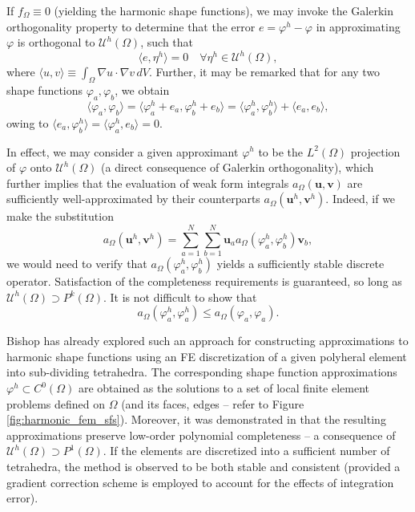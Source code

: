 	If $f_\Omega \equiv 0$ (yielding the harmonic shape functions), we may invoke the Galerkin orthogonality property to determine that the error $e = \varphi^h - \varphi$ in approximating $\varphi$ is orthogonal to $\mathcal{U}^h (\Omega)$, such that
	\begin{equation}
		\langle e, \eta^h \rangle = 0 \quad \forall \eta^h \in \mathcal{U}^h (\Omega),
	\end{equation}
	where $\langle u, v \rangle \equiv \int_\Omega \nabla u \cdot \nabla v \, dV$. Further, it may be remarked that for any two shape functions $\varphi_a, \varphi_b$, we obtain
	\begin{equation}
		\langle \varphi_a, \varphi_b \rangle = \langle \varphi^h_a + e_a, \varphi^h_b + e_b \rangle = \langle \varphi^h_a, \varphi^h_b \rangle + \langle e_a, e_b \rangle,
	\end{equation}
	owing to $\langle e_a, \varphi^h_b \rangle = \langle \varphi^h_a, e_b \rangle = 0$.

	In effect, we may consider a given approximant $\varphi^h$ to be the $L^2(\Omega)$ projection of $\varphi$ onto $\mathcal{U}^h (\Omega)$ (a direct consequence of Galerkin orthogonality), which further implies that the evaluation of weak form integrals $a_\Omega (\mathbf{u}, \mathbf{v})$ are sufficiently well-approximated by their counterparts $a_\Omega (\mathbf{u}^h, \mathbf{v}^h)$. Indeed, if we make the substitution
	\begin{equation}
		a_\Omega (\mathbf{u}^h, \mathbf{v}^h) = \sum_{a=1}^N \sum_{b=1}^N  \mathbf{u}_a a_\Omega (  \varphi^h_a, \varphi^h_b ) \mathbf{v}_b,
	\end{equation}
	we would need to verify that $a_\Omega (  \varphi^h_a, \varphi^h_b )$ yields a sufficiently stable discrete operator. Satisfaction of the completeness requirements is guaranteed, so long as $\mathcal{U}^h (\Omega) \supset P^k(\Omega)$. It is not difficult to show that
	\begin{equation}
		a_\Omega (  \varphi^h_a, \varphi^h_a ) \leq a_\Omega (  \varphi_a, \varphi_a ).
	\end{equation}
	
	Bishop has already explored such an approach for constructing approximations to harmonic shape functions using an FE discretization of a given polyheral element into sub-dividing tetrahedra. The corresponding shape function approximations $\varphi^h \subset C^0 (\Omega)$ are obtained as the solutions to a set of local finite element problems defined on $\Omega$ (and its faces, edges -- refer to Figure \ref{fig:harmonic_fem_sfs}). Moreover, it was demonstrated in \cite{Bishop:14} that the resulting approximations preserve low-order polynomial completeness -- a consequence of $\mathcal{U}^h (\Omega) \supset P^1 (\Omega)$. If the elements are discretized into a sufficient number of tetrahedra, the method is observed to be both stable and consistent (provided a gradient correction scheme is employed to account for the effects of integration error).
	
